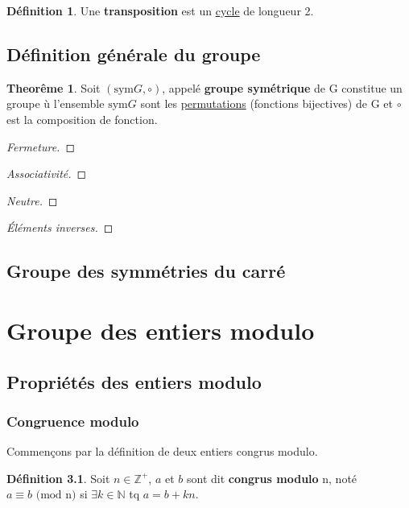 \documentclass[12pt]{book}
\let\Bbb\mathbb
\theoremstyle{definition}
\newtheorem{definition}{Définition}[section]
\newtheorem{theorem}{Theorême}[section]
\begin{document}
\begin{definition}
    \label{def:transposition}
    Une \textbf{transposition} est un \hyperref[def:cycle]{cycle} de longueur 2.
\end{definition}

\section{Définition générale du groupe}
\begin{theorem}
    \label{thm:groupe_symmetrique}
    Soit $(\text{sym} G, \circ)$, appelé \textbf{groupe symétrique} de G constitue un groupe ù 
    l'ensemble $\text{sym} G$ sont les \hyperref[def:permutation]{permutations} (fonctions bijectives) de G 
    et $\circ$ est la composition de fonction.
\end{theorem}

\begin{proof}[Fermeture]
    
\end{proof}

\begin{proof}[Associativité]
\end{proof}

\begin{proof}[Neutre]
\end{proof}

\begin{proof}[Éléments inverses]
\end{proof}

\section{Groupe des symmétries du carré}
\chapter{Groupe des entiers modulo}
\section{Propriétés des entiers modulo}
\subsection{Congruence modulo}

Commençons par la définition de deux entiers congrus modulo.

\begin{definition}
    \label{def:mod}
    Soit $n \in \Bbb Z^+$, $a$ et $b$ sont dit \textbf{congrus modulo} n, noté $a \equiv b\text{ (mod n)}$
    si $\exists k \in \Bbb N $ tq $ a = b + kn$.
\end{definition}
\end{document}
